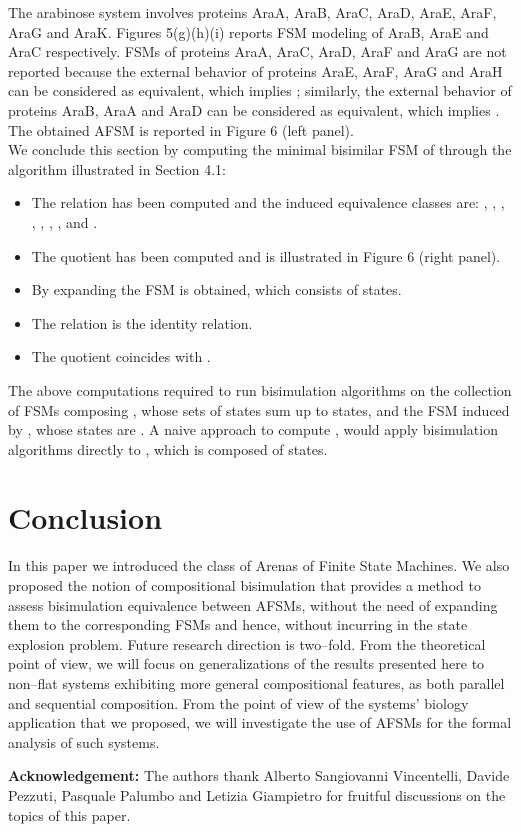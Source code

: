 \documentclass{amsart}
\theoremstyle{definition}
\theoremstyle{remark}
\numberwithin{equation}{section}
\begin{document}
The arabinose system involves proteins AraA, AraB, AraC, AraD, AraE, AraF, AraG and AraK. 
Figures 5(g)(h)(i) reports FSM modeling of AraB, AraE and AraC respectively. FSMs of proteins AraA, AraC, AraD, AraF and AraG are not reported because the external behavior of proteins AraE, AraF, AraG and AraH can be considered as equivalent, which implies ; similarly, the external behavior of proteins AraB, AraA and AraD can be considered as equivalent, which implies . 
The obtained AFSM  is reported in Figure 6 (left panel). \\ 
We conclude this section by computing the minimal bisimilar FSM of  through the algorithm illustrated in Section 4.1: 
\begin{itemize} 
\item The relation  has been computed and the induced equivalence classes are: , , , , , , ,  and  . 
\item The quotient  has been computed and is illustrated in Figure 6 (right panel). 
\item By expanding  the FSM  is obtained, which consists of  states. 
\item The relation  is the identity relation.
\item The quotient  coincides with .
\end{itemize}
The above computations required to run bisimulation algorithms on the collection of FSMs  composing , whose sets of states sum up to  states, and the FSM  induced by , whose states are . A naive approach to compute , would apply bisimulation algorithms directly to , which is composed of  states. 

\section{Conclusion}
In this paper we introduced the class of Arenas of Finite State Machines. We also proposed the notion of compositional bisimulation that 
provides a method to assess bisimulation equivalence between AFSMs, without the need of expanding them to the corresponding FSMs and hence, without incurring in the state explosion problem. Future research direction is two--fold. From the theoretical point of view, we will focus on generalizations of the results presented here to non--flat systems exhibiting more general compositional features, as both parallel and sequential composition. From the point of view of the systems' biology application that we proposed, we will investigate the use of AFSMs for the formal analysis of such systems.

\textbf{Acknowledgement:} The authors thank Alberto Sangiovanni Vincentelli, Davide Pezzuti, Pasquale Palumbo and Letizia Giampietro for fruitful discussions on the topics of this paper.



\end{document}

